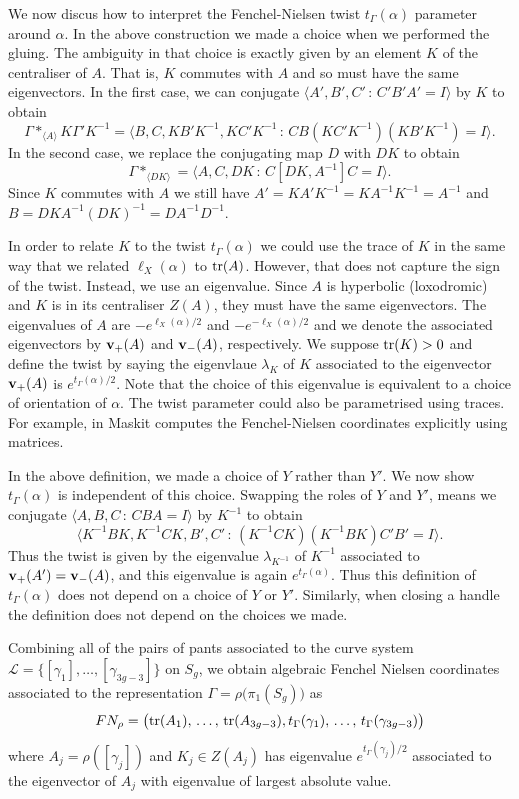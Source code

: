 \documentclass[11pt]{amsart}
\numberwithin{equation}{section}
\begin{document}
We now discus how to interpret the Fenchel-Nielsen twist $t_\Gamma(\alpha)$ parameter around $\alpha$. In the above construction
we made a choice when we performed the gluing. The ambiguity in that choice is exactly given by an element $K$ of the
centraliser of $A$. That is, $K$ commutes with $A$ and so must have the same eigenvectors. In the first case,
we can conjugate $\langle A',B',C'\,:\, C'B'A'=I\rangle$ by $K$ to obtain
$$
\Gamma*_{\langle A\rangle}K\Gamma'K^{-1}=\langle B,C,KB'K^{-1},KC'K^{-1}\,:\, CB(KC'K^{-1})(KB'K^{-1})=I\rangle.
$$
In the second case, we replace the conjugating map $D$ with $DK$ to obtain
$$
\Gamma *_{\langle DK\rangle}=\langle A,C,DK\,:\, C[DK,A^{-1}]C=I\rangle.
$$
Since $K$ commutes with $A$ we still have $A'=KA'K^{-1}=KA^{-1}K^{-1}=A^{-1}$ and $B=DKA^{-1}(DK)^{-1}=DA^{-1}D^{-1}$.

In order to relate $K$ to the twist $t_\Gamma(\alpha)$ we could use the trace of $K$ in the same way that we 
related $\ell_X(\alpha)$ to ${\rm tr}(A)$. However, that does not capture the sign of the twist. 
Instead, we use an eigenvalue.  Since $A$ is 
hyperbolic (loxodromic) and $K$ is in its centraliser $Z(A)$, they must have the same eigenvectors. The eigenvalues of $A$ are
$-e^{\ell_X(\alpha)/2}$ and $-e^{-\ell_X(\alpha)/2}$ and we denote the associated eigenvectors by 
${\bf v}_+(A)$ and ${\bf v}_-(A)$, respectively. We suppose
${\rm tr}(K)>0$ and define the twist by saying the eigenvlaue $\lambda_K$ of $K$ associated to the eigenvector ${\bf v}_+(A)$ 
is $e^{t_\Gamma(\alpha)/2}$. Note that the choice of this eigenvalue is equivalent to a choice of orientation of $\alpha$. 
The twist parameter could also be parametrised using traces. For example, in \cite{Mas} Maskit computes the 
Fenchel-Nielsen coordinates explicitly using matrices.

In the above definition, we made a choice of $Y$ rather than $Y'$. We now show $t_\Gamma(\alpha)$ is independent of this
choice. Swapping the roles of $Y$ and $Y'$, means we conjugate $\langle A,B,C\,:\,CBA=I\rangle$ by $K^{-1}$ to obtain
$$
\langle K^{-1}BK,K^{-1}CK,B',C'\,:\, (K^{-1}CK)(K^{-1}BK)C'B'=I\rangle.
$$
Thus the twist is given by the eigenvalue $\lambda_{K^{-1}}$ of $K^{-1}$ associated to ${\bf v}_+(A')={\bf v}_-(A)$, and this 
eigenvalue is again $e^{t_\Gamma(\alpha)}$. Thus this definition of $t_\Gamma(\alpha)$ does not depend on a 
choice of $Y$ or $Y'$.
Similarly, when closing a handle the definition does not depend on the choices we made. 

Combining all of the pairs of pants associated to the curve system $\mathcal{L}=\{[\gamma_1],\ldots,[\gamma_{3g-3}]\}$ on $S_g$,
we obtain algebraic Fenchel Nielsen coordinates associated to the representation $\Gamma=\rho\bigl(\pi_1(S_g)\bigr)$ as 
$$
FN_\rho=\bigl({\rm tr}(A_1),\,\ldots,\,{\rm tr}(A_{3g-3}),t_\Gamma(\gamma_1),\,\ldots,\,t_\Gamma(\gamma_{3g-3})\bigr)
$$
where $A_j=\rho([\gamma_j])$ and $K_j\in Z(A_j)$ has eigenvalue $e^{t_\Gamma(\gamma_j)/2}$ associated to the 
eigenvector of $A_j$
with eigenvalue of largest absolute value. 
\end{document}
